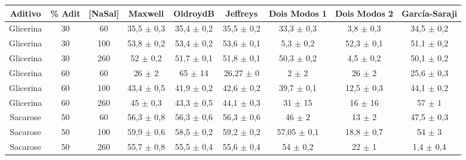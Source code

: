 	\begin{table}[h]
		\begin{adjustbox}{angle=90}
	{%
		\begin{tabular}{c c c | c c c c c c}
			\toprule
         Aditivo  & \% Adit & [NaSal] & Maxwell             & OldroydB             & Jeffreys             & Dois Modos 1            & Dois Modos 2                      & García-Saraji    \\ \midrule
		Glicerina & 30         & 60         & 35,5    \(\pm\) 0,3 & 35,4     \(\pm\) 0,2 & 35,5     \(\pm\) 0,2 & 33,3        \(\pm\) 0,3 & 3,8         \(\pm\) 0,3 & 34,5  \(\pm\)  0,2 \\
		Glicerina & 30         & 100        & 53,8    \(\pm\) 0,2 & 53,4     \(\pm\) 0,2 & 53,6     \(\pm\) 0,1 & 5,3         \(\pm\) 0,2 & 52,3        \(\pm\) 0,1 & 51,1  \(\pm\)  0,2 \\
		Glicerina & 30         & 260        & 52      \(\pm\) 0,2 & 51,7     \(\pm\) 0,1 & 51,8     \(\pm\) 0,1 & 50,3        \(\pm\) 0,2 & 4,5         \(\pm\) 0,2 & 50,1  \(\pm\)  0,2 \\ 
		Glicerina & 60         & 60         & 26      \(\pm\) 2   & 65       \(\pm\) 14  & 26,27    \(\pm\) 0   & 2           \(\pm\) 2   & 26          \(\pm\) 2   & 25,6  \(\pm\)  0,3 \\
		Glicerina & 60         & 100        & 43,4    \(\pm\) 0,5 & 41,9     \(\pm\) 0,2 & 42,6     \(\pm\) 0,2 & 39,7        \(\pm\) 0,1 & 12,5        \(\pm\) 0,3 & 44,1  \(\pm\)  0,2 \\
		Glicerina & 60         & 260        & 45      \(\pm\) 0,3 & 43,3     \(\pm\) 0,5 & 44,1     \(\pm\) 0,3 & 31          \(\pm\) 15  & 16          \(\pm\) 16  & 57    \(\pm\)  1 \\ 
		Sacarose  & 50         & 60         & 56,3    \(\pm\) 0,8 & 56,3     \(\pm\) 0,6 & 56,3     \(\pm\) 0,6 & 46          \(\pm\) 2   & 13          \(\pm\) 2   & 47,5  \(\pm\)  0,3 \\
		Sacarose  & 50         & 100        & 59,9    \(\pm\) 0,6 & 58,5     \(\pm\) 0,2 & 59,2     \(\pm\) 0,2 & 57,05       \(\pm\) 0,1 & 18,8        \(\pm\) 0,7 & 54    \(\pm\)   3 \\
		Sacarose  & 50         & 260        & 55,7    \(\pm\) 0,8 & 55,5     \(\pm\) 0,4 & 55,6     \(\pm\) 0,4 & 54          \(\pm\) 0,2 & 22          \(\pm\) 1   & 1,4   \(\pm\)   0,4 \\  \midrule

\end{tabular}}
\end{adjustbox}
\end{table}
